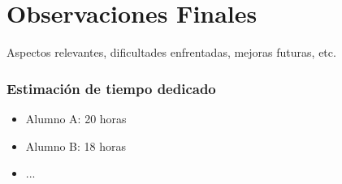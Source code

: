 \chapter{Observaciones Finales}

Aspectos relevantes, dificultades enfrentadas, mejoras futuras, etc.

\subsection*{Estimación de tiempo dedicado}

\begin{itemize}
    \item Alumno A: 20 horas
    \item Alumno B: 18 horas
    \item ...
\end{itemize}
